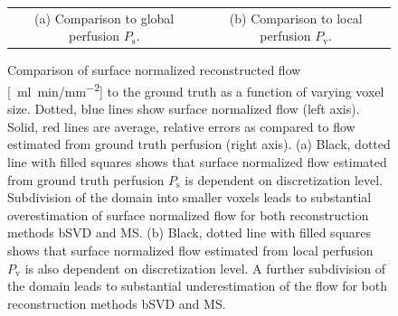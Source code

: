 \documentclass[final,5p,times,twocolumn]{elsarticle}
\begin{document}
\begin{figure}[!htb]
\begin{tabular}{c c}
    		(a) Comparison to global perfusion $P_{\mathrm{s}}$. & (b) Comparison to local perfusion $P_{\mathrm{v}}$.
    	\end{tabular}
    	\caption{Comparison of surface normalized reconstructed flow [\SI{}{\milli\litre\per\minute/\milli\meter\squared}] to the ground truth as a function of varying voxel size. Dotted, blue lines show surface normalized flow (left axis). Solid, red lines are average, relative errors as compared to flow estimated from ground truth perfusion (right axis). (a) Black, dotted line with filled squares shows that surface normalized flow estimated from ground truth perfusion $P_{\mathrm{s}}$ is dependent on discretization level. Subdivision of the domain into smaller voxels leads to substantial overestimation of surface normalized flow for both reconstruction methods bSVD and MS. (b) Black, dotted line with filled squares shows that surface normalized flow estimated from local perfusion $P_{\mathrm{v}}$ is also dependent on discretization level. A further subdivision of the domain leads to substantial underestimation of the flow for both reconstruction methods bSVD and MS.}
            \label{fig:surfnormperf}
    \end{figure}
\end{document}
